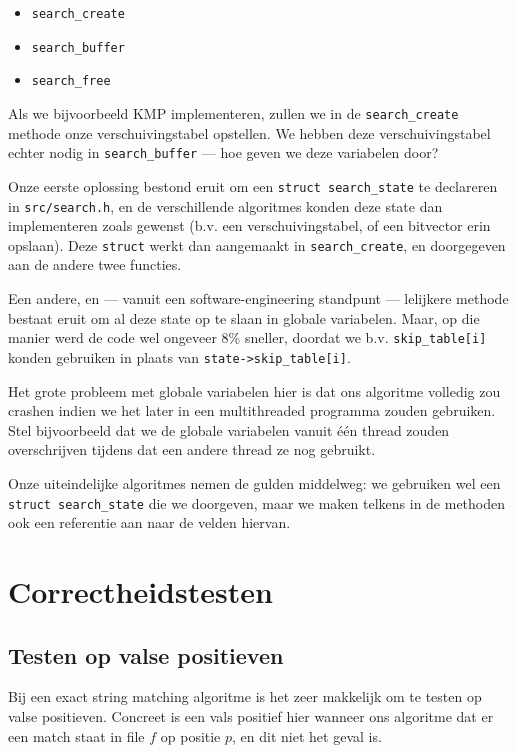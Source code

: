 \documentclass[a4paper,11pt]{article}
\begin{document}
\begin{itemize}
    \item \verb#search_create#
    \item \verb#search_buffer#
    \item \verb#search_free#
\end{itemize}

Als we bijvoorbeeld KMP implementeren, zullen we in de \verb#search_create#
methode onze verschuivingstabel opstellen. We hebben deze verschuivingstabel
echter nodig in \verb#search_buffer# — hoe geven we deze variabelen door?

Onze eerste oplossing bestond eruit om een \verb#struct search_state# te
declareren in \verb#src/search.h#, en de verschillende algoritmes konden
deze state dan implementeren zoals gewenst (b.v. een verschuivingstabel,
of een bitvector erin opslaan). Deze \verb#struct# werkt dan aangemaakt in
\verb#search_create#, en doorgegeven aan de andere twee functies.

Een andere, en — vanuit een software-engineering standpunt — lelijkere methode
bestaat eruit om al deze state op te slaan in globale variabelen. Maar, op die
manier werd de code wel ongeveer 8\% sneller, doordat we b.v.
\verb#skip_table[i]# konden gebruiken in plaats van \verb#state->skip_table[i]#.

Het grote probleem met globale variabelen hier is dat ons algoritme volledig zou
crashen indien we het later in een multithreaded programma zouden gebruiken.
Stel bijvoorbeeld dat we de globale variabelen vanuit \'e\'en thread zouden
overschrijven tijdens dat een andere thread ze nog gebruikt.

Onze uiteindelijke algoritmes nemen de gulden middelweg: we gebruiken wel een
\verb#struct search_state# die we doorgeven, maar we maken telkens in de
methoden ook een referentie aan naar de velden hiervan.

\section{Correctheidstesten}

\subsection{Testen op valse positieven}

Bij een exact string matching algoritme is het zeer makkelijk om te testen op
valse positieven. Concreet is een vals positief hier wanneer ons algoritme dat
er een match staat in file $f$ op positie $p$, en dit niet het geval is.
\end{document}
